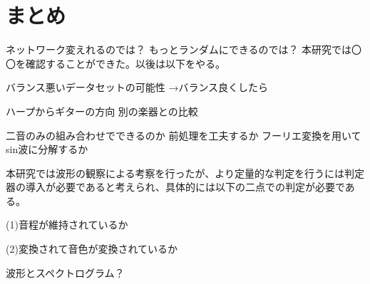 \chapter{まとめ}

ネットワーク変えれるのでは？
もっとランダムにできるのでは？
本研究では〇〇を確認することができた。以後は以下をやる。


バランス悪いデータセットの可能性
→バランス良くしたら

ハープからギターの方向
別の楽器との比較


二音のみの組み合わせでできるのか
前処理を工夫するか
フーリエ変換を用いてsin波に分解するか

本研究では波形の観察による考察を行ったが、より定量的な判定を行うには判定器の導入が必要であると考えられ、具体的には以下の二点での判定が必要である。

(1)音程が維持されているか

(2)変換されて音色が変換されているか

波形とスペクトログラム？